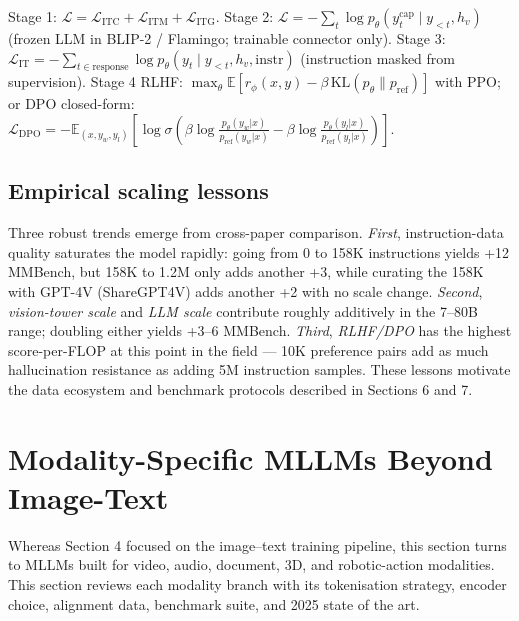 Stage 1: \(\mathcal{L} = \mathcal{L}_{\text{ITC}} + \mathcal{L}_{\text{ITM}} + \mathcal{L}_{\text{ITG}}\).
Stage 2: \(\mathcal{L} = -\sum_t \log p_\theta(y_t^{\text{cap}} \mid y_{<t}, h_v)\) (frozen LLM in BLIP-2 / Flamingo; trainable connector only).
Stage 3: \(\mathcal{L}_{\text{IT}} = -\sum_{t \in \text{response}} \log p_\theta(y_t \mid y_{<t}, h_v, \text{instr})\) (instruction masked from supervision).
Stage 4 RLHF: \(\max_\theta \mathbb{E}[r_\phi(x, y) - \beta \, \text{KL}(p_\theta \| p_{\text{ref}})]\) with PPO; or DPO closed-form: \(\mathcal{L}_{\text{DPO}} = -\mathbb{E}_{(x,y_w,y_l)}\left[\log \sigma\!\left(\beta \log \frac{p_\theta(y_w|x)}{p_{\text{ref}}(y_w|x)} - \beta \log \frac{p_\theta(y_l|x)}{p_{\text{ref}}(y_l|x)}\right)\right]\).

\subsection{Empirical scaling lessons}\label{empirical-scaling-lessons}

Three robust trends emerge from cross-paper comparison. \emph{First}, instruction-data quality saturates the model rapidly: going from 0 to 158K instructions yields +12 MMBench, but 158K to 1.2M only adds another +3, while curating the 158K with GPT-4V (ShareGPT4V) adds another +2 with no scale change. \emph{Second}, \emph{vision-tower scale} and \emph{LLM scale} contribute roughly additively in the 7--80B range; doubling either yields +3--6 MMBench. \emph{Third}, \emph{RLHF/DPO} has the highest score-per-FLOP at this point in the field --- 10K preference pairs add as much hallucination resistance as adding 5M instruction samples. These lessons motivate the data ecosystem and benchmark protocols described in Sections 6 and 7.

\section{Modality-Specific MLLMs Beyond Image-Text}\label{modality-specific-mllms-beyond-image-text}

Whereas Section 4 focused on the image--text training pipeline, this section turns to MLLMs built for video, audio, document, 3D, and robotic-action modalities. This section reviews each modality branch with its tokenisation strategy, encoder choice, alignment data, benchmark suite, and 2025 state of the art.

